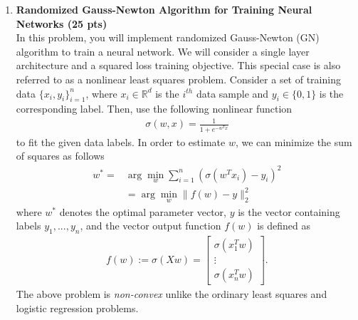 \begin{enumerate}
\item \textbf{Randomized Gauss-Newton Algorithm for Training Neural Networks (25 pts)}\\
In this problem, you will implement randomized Gauss-Newton (GN) algorithm to train a neural network. We will consider a single layer architecture and a squared loss training objective. This special case is also referred to as a nonlinear least squares problem. Consider a set of training data $\{x_i,y_i\}_{i=1}^n$, where $x_i \in \mathbb{R}^d$ is the $i^{th}$ data sample and $y_i \in \{0,1\}$ is the corresponding label. Then, use the following nonlinear function
\begin{align*}
    \sigma(w,x)=\frac{1}{1+e^{-w^Tx}}
\end{align*}
to fit the given data labels. In order to estimate $w$, we can minimize the sum of squares as follows 
\begin{align*}
    w^*= &\arg \min_{w} \sum_{i=1}^n (\sigma(w^Tx_i)-y_i)^2 \\
    &=\arg \min_w \|f(w) - y\|_2^2
\end{align*}
where $w^*$ denotes the optimal parameter vector, $y$ is the vector containing labels $y_1,...,y_n$, and the vector output function $f(w)$ is defined as
\begin{align*}
    f(w):=\sigma(Xw) = \left[\begin{array}{c} \sigma(x_1^Tw)\\ \vdots \\ \sigma(x_n^Tw) \end{array}
    \right].
\end{align*} The above problem is \emph{non-convex} unlike the ordinary least squares and logistic regression problems.
%






\end{enumerate}
